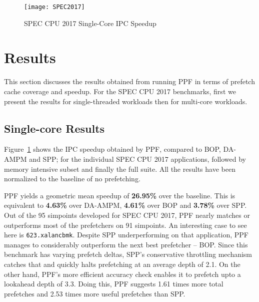 \begin{figure}[ht]
\texttt{[image: SPEC2017]}
\caption{SPEC CPU 2017 Single-Core IPC Speedup}
\label{Fig:SPEC2017_1core}
\end{figure}

\section{Results}
\label{Results}

This section discusses the results obtained from running PPF in terms of
prefetch cache coverage and speedup. For the SPEC CPU 2017 benchmarks, first
we present the results for single-threaded workloads then for multi-core
workloads.

\subsection{Single-core Results}
\label{Results-Single}


Figure~\ref{Fig:SPEC2017_1core} shows the IPC speedup obtained by PPF,
compared to BOP, DA-AMPM and SPP; for the individual SPEC CPU 2017 
applications, followed by memory intensive subset and finally the full
suite. All the results have been normalized to the baseline of no prefetching.


PPF yields a geometric mean speedup of \textbf{26.95\%} over the baseline. 
This is equivalent to \textbf{4.63\%} over DA-AMPM, \textbf{4.61\%} over BOP 
and \textbf{3.78\%} over SPP. Out of the 95 simpoints developed for SPEC 
CPU 2017, PPF nearly matches or outperforms most of the prefetchers on 91 
simpoints. 
An interesting case to see here is {\tt 623.xalancbmk}. Despite SPP 
underperforming on that application, PPF manages to considerably outperform 
the next best prefetcher -- BOP. Since this benchmark has varying prefetch 
deltas, SPP's conservative throttling mechanism catches that and quickly halts 
prefetching at an average depth of 2.1. On the other hand, PPF's more efficient 
accuracy check enables it to prefetch upto a lookahead depth of 3.3. Doing this, PPF 
suggests 1.61 times more total prefetches and 2.53 times more 
useful prefetches than SPP.

